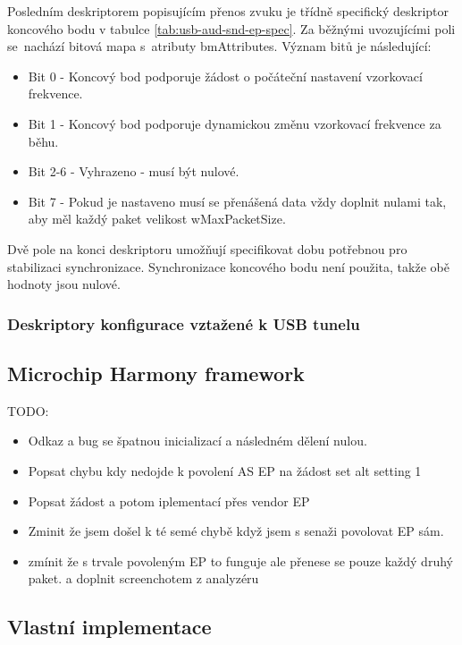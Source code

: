 Posledním deskriptorem popisujícím přenos zvuku je třídně specifický deskriptor koncového bodu v tabulce \ref{tab:usb-aud-snd-ep-spec}. Za běžnými uvozujícími poli se~nachází bitová mapa s~atributy bmAttributes. Význam bitů je následující:
\begin{itemize}
\item Bit 0 - Koncový bod podporuje žádost o počáteční nastavení vzorkovací frekvence.
\item Bit 1 - Koncový bod podporuje dynamickou změnu vzorkovací frekvence za běhu.
\item Bit 2-6 - Vyhrazeno - musí být nulové.
\item Bit 7 - Pokud je nastaveno musí se přenášená data vždy doplnit nulami tak, aby měl každý paket velikost wMaxPacketSize.
\end{itemize}

Dvě pole na konci deskriptoru umožňují specifikovat dobu potřebnou pro stabilizaci synchronizace. Synchronizace koncového bodu není použita, takže obě hodnoty jsou nulové.

\clearpage

\subsubsection{Deskriptory konfigurace vztažené k USB \iic tunelu}



\subsection{Microchip Harmony framework}

TODO:
\begin{itemize}
\item Odkaz a bug se špatnou inicializací a následném dělení nulou.
\item Popsat chybu kdy nedojde k povolení AS EP na žádost set alt setting 1
\item Popsat žádost a potom iplementací přes vendor EP
\item Zminit že jsem došel k té semé chybě když jsem s senaži povolovat EP sám.
\item zmínit že s trvale povoleným EP to funguje ale přenese se pouze každý druhý paket. a doplnit screenchotem z analyzéru
\end{itemize}

\subsection{Vlastní implementace}

